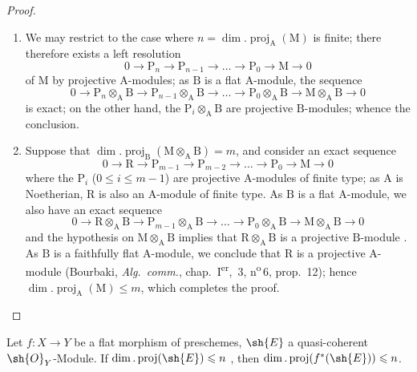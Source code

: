 \begin{proof}
\medskip\noindent
\begin{enumerate}[label=(\roman*)]
  \item We may restrict to the case where $n=\dim.\operatorname{proj}_\mathrm{A}(\mathrm{M})$ is finite; there therefore exists a left resolution
\[
  0\to\mathrm{P}_n\to\mathrm{P}_{n-1}\to\ldots\to\mathrm{P}_0\to\mathrm{M}\to 0
\]
of $\mathrm{M}$ by projective $\mathrm{A}$-modules; as $\mathrm{B}$ is a flat $\mathrm{A}$-module, the sequence
\[
  0\to\mathrm{P}_n\otimes_\mathrm{A}\mathrm{B}\to\mathrm{P}_{n-1}\otimes_\mathrm{A}\mathrm{B}\to\ldots\to\mathrm{P}_0\otimes_\mathrm{A}\mathrm{B}\to\mathrm{M}\otimes_\mathrm{A}\mathrm{B}\to 0
\]
is exact; on the other hand, the $\mathrm{P}_i\otimes_\mathrm{A}\mathrm{B}$ are projective $\mathrm{B}$-modules; whence the conclusion.

  \item Suppose that $\dim.\operatorname{proj}_\mathrm{B}(\mathrm{M}\otimes_\mathrm{A}\mathrm{B})=m$, and consider an exact sequence
\[
  0\to\mathrm{R}\to\mathrm{P}_{m-1}\to\mathrm{P}_{m-2}\to\ldots\to\mathrm{P}_0\to\mathrm{M}\to 0
\]
where the $\mathrm{P}_i$ ($0\leqslant i\leqslant m-1$) are projective $\mathrm{A}$-modules of finite type; as $\mathrm{A}$ is Noetherian, $\mathrm{R}$ is also an $\mathrm{A}$-module of finite type.
As $\mathrm{B}$ is a flat $\mathrm{A}$-module, we also have an exact sequence
\[
  0\to\mathrm{R}\otimes_\mathrm{A}\mathrm{B}\to\mathrm{P}_{m-1}\otimes_\mathrm{A}\mathrm{B}\to\ldots\to\mathrm{P}_0\otimes_\mathrm{A}\mathrm{B}\to\mathrm{M}\otimes_\mathrm{A}\mathrm{B}\to 0
\]
and the hypothesis on $\mathrm{M}\otimes_\mathrm{A}\mathrm{B}$ implies that $\mathrm{R}\otimes_\mathrm{A}\mathrm{B}$ is a projective $\mathrm{B}$-module .
As $\mathrm{B}$ is a faithfully flat $\mathrm{A}$-module, we conclude that $\mathrm{R}$ is a projective $\mathrm{A}$-module (Bourbaki, \emph{Alg.\ comm.}, chap.~I\textsuperscript{er}, \textsection\,3, n\textsuperscript{o}\,6, prop.~12); hence $\dim.\operatorname{proj}_\mathrm{A}(\mathrm{M})\leqslant m$, which completes the proof.
\end{enumerate}
\end{proof}

\begin{corollary}[6.2.2]
\label{IV.6.2.2}
Let $f:X\to Y$ be a flat morphism of preschemes, $\sh{E}$ a quasi-coherent $\sh{O}_Y$-Module.
If $\dim.\operatorname{proj}(\sh{E})\leqslant n$ , then $\dim.\operatorname{proj}(f^*(\sh{E}))\leqslant n$.
\end{corollary}

